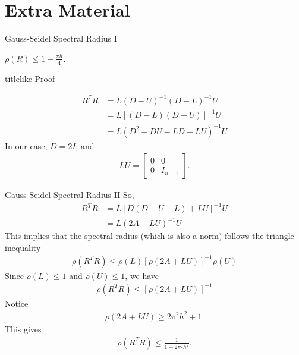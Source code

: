 \documentclass{beamer}
\begin{document}
\section*{Extra Material}%

\begin{frame}[label=gaussSeidelProof]{Gauss-Seidel Spectral Radius I}
 \begin{theorem}
  $\rho(R) \leq 1-\frac{\pi h}{4}$.
 \end{theorem}
  \begin{beamercolorbox}{titlelike}
   Proof
  \end{beamercolorbox}
  \begin{align}
   R^TR &= L(D-U)^{-1}(D-L)^{-1}U \nonumber \\
        &= L\left[ (D-L)(D-U) \right]^{-1}U \nonumber \\
        &= L(D^2 -DU -LD +LU)^{-1}U \nonumber
  \end{align}
  In our case, $D=2I$, and
  \begin{align}
   LU = \begin{bmatrix}0 & 0\\0 & I_{n-1}\end{bmatrix}.
  \end{align}
\end{frame}
\begin{frame}{Gauss-Seidel Spectral Radius II}
  So,
  \begin{align}
   R^TR &= L\left[ D(D-U-L) +LU \right]^{-1}U \nonumber \\
        &= L(2A+LU)^{-1}U
  \end{align}
  This implies that the spectral radius (which is also a norm) follows
  the triangle inequality
  \begin{align}
   \rho(R^TR) \leq \rho(L)\left[\rho(2A+LU)\right]^{-1}\rho(U) \nonumber
  \end{align}
  Since $\rho(L) \leq 1$ and $\rho(U) \leq 1$, we have
  \begin{align}
   \rho(R^TR) \leq \left[\rho(2A+LU)\right]^{-1} \nonumber
  \end{align}
  Notice
  \begin{align}
   \rho(2A+LU) \geq 2\pi^2h^2+1. \nonumber
  \end{align}
  This gives
  \begin{align}
   \rho(R^TR) \leq \frac{1}{1+2\pi^2h^2}. \nonumber
  \end{align}
\end{frame}
\end{document}
